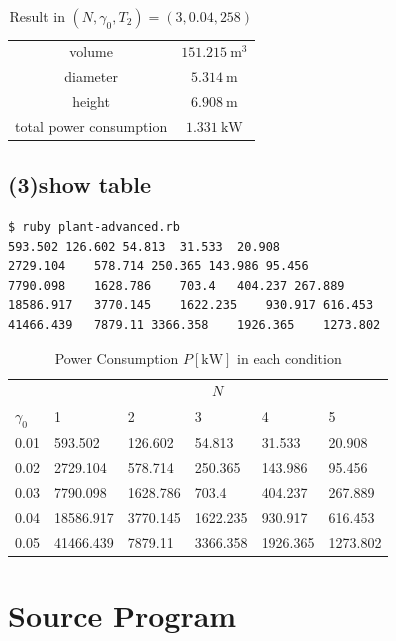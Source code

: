 \documentclass[a4paper,titlepage]{article}
\begin{document}
  \begin{table}[htbp]
    \centering
    \begin{tabular}{cc}\hline
      volume & $\SI{151.215}{\cubic\meter}$ \\
      diameter & $\SI{5.314}{\meter}$ \\
      height & $\SI{6.908}{\meter}$ \\
      total power consumption & $\SI{1.331}{\kilo\watt}$ \\ \hline
    \end{tabular}
    \caption{Result in $(N, \gamma_0, T_2) = (3, 0.04, 258)$}
  \end{table}

  \newpage

  \subsection*{(3)show table}
  \begin{screen}
    \begin{verbatim}
$ ruby plant-advanced.rb
593.502 126.602	54.813	31.533	20.908
2729.104	578.714	250.365	143.986	95.456
7790.098	1628.786	703.4	404.237	267.889
18586.917	3770.145	1622.235	930.917	616.453
41466.439	7879.11	3366.358	1926.365	1273.802\end{verbatim}
  \end{screen}

  \begin{table}[htbp]
    \centering
    \begin{tabular}{l|lllll}\hline
      & \multicolumn{5}{c}{$N$} \\
      $\gamma_0$ & 1 & 2 & 3 & 4 & 5 \\ \hline
      0.01 & 593.502 & 126.602 & 54.813 & 31.533 & 20.908 \\
      0.02 & 2729.104 & 578.714 & 250.365 & 143.986 & 95.456 \\
      0.03 & 7790.098 & 1628.786 & 703.4 & 404.237 & 267.889 \\
      0.04 & 18586.917 & 3770.145 & 1622.235 & 930.917 & 616.453 \\
      0.05 & 41466.439 & 7879.11 & 3366.358 & 1926.365 & 1273.802 \\\hline
      \end{tabular}
    \caption{Power Consumption $P [\si{\kilo\watt}]$ in each condition}
  \end{table}

  \newpage

  \section{Source Program}
  
\end{document}
